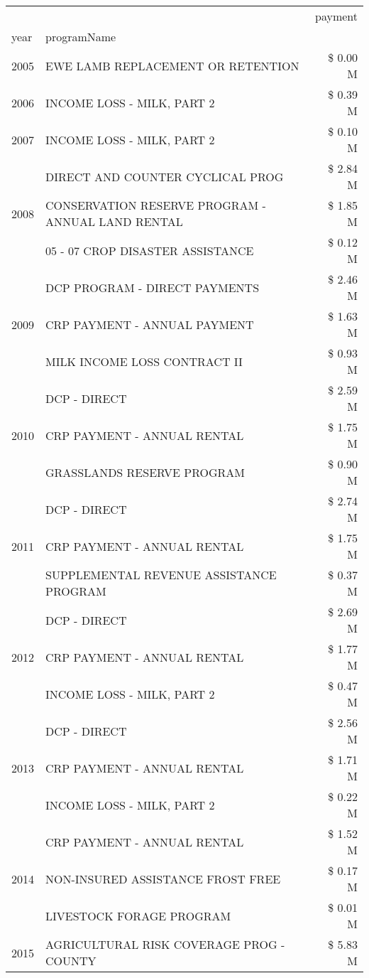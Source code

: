 \begin{tabular}{llr}
\toprule
 &  & payment \\
year & programName &  \\
\midrule
2005 & EWE LAMB REPLACEMENT OR RETENTION & \$ 0.00 M \\
\cline{1-3}
2006 & INCOME LOSS - MILK, PART 2 & \$ 0.39 M \\
\cline{1-3}
2007 & INCOME LOSS - MILK, PART 2 & \$ 0.10 M \\
\cline{1-3}
\multirow[t]{3}{*}{2008} & DIRECT AND COUNTER CYCLICAL PROG & \$ 2.84 M \\
 & CONSERVATION RESERVE PROGRAM - ANNUAL LAND RENTAL & \$ 1.85 M \\
 & 05 - 07 CROP DISASTER ASSISTANCE & \$ 0.12 M \\
\cline{1-3}
\multirow[t]{3}{*}{2009} & DCP PROGRAM - DIRECT PAYMENTS & \$ 2.46 M \\
 & CRP PAYMENT - ANNUAL PAYMENT & \$ 1.63 M \\
 & MILK INCOME LOSS CONTRACT II & \$ 0.93 M \\
\cline{1-3}
\multirow[t]{3}{*}{2010} & DCP - DIRECT & \$ 2.59 M \\
 & CRP PAYMENT - ANNUAL RENTAL & \$ 1.75 M \\
 & GRASSLANDS RESERVE PROGRAM & \$ 0.90 M \\
\cline{1-3}
\multirow[t]{3}{*}{2011} & DCP - DIRECT & \$ 2.74 M \\
 & CRP PAYMENT - ANNUAL RENTAL & \$ 1.75 M \\
 & SUPPLEMENTAL REVENUE ASSISTANCE PROGRAM & \$ 0.37 M \\
\cline{1-3}
\multirow[t]{3}{*}{2012} & DCP - DIRECT & \$ 2.69 M \\
 & CRP PAYMENT - ANNUAL RENTAL & \$ 1.77 M \\
 & INCOME LOSS - MILK, PART 2 & \$ 0.47 M \\
\cline{1-3}
\multirow[t]{3}{*}{2013} & DCP - DIRECT & \$ 2.56 M \\
 & CRP PAYMENT - ANNUAL RENTAL & \$ 1.71 M \\
 & INCOME LOSS - MILK, PART 2 & \$ 0.22 M \\
\cline{1-3}
\multirow[t]{3}{*}{2014} & CRP PAYMENT - ANNUAL RENTAL & \$ 1.52 M \\
 & NON-INSURED ASSISTANCE FROST FREE & \$ 0.17 M \\
 & LIVESTOCK FORAGE PROGRAM & \$ 0.01 M \\
\cline{1-3}
\multirow[t]{3}{*}{2015} & AGRICULTURAL RISK COVERAGE PROG - COUNTY & \$ 5.83 M \\

\end{tabular}
